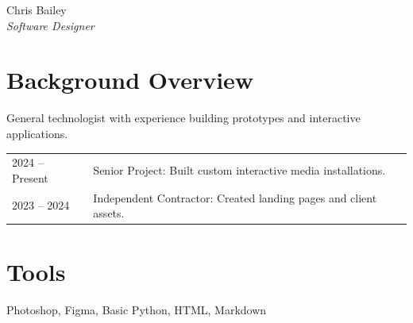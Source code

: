 \documentclass{article}
\begin{document}
\begin{center}
{\huge Chris Bailey} \\
\textit{Software Designer}
\end{center}

\section*{Background Overview}
General technologist with experience building prototypes and interactive applications.

\begin{table}[h]
\begin{tabular}{|l|p{10cm}|}
\hline
2024 -- Present & Senior Project: Built custom interactive media installations. \\
2023 -- 2024 & Independent Contractor: Created landing pages and client assets. \\
\hline
\end{tabular}
\end{table}

\section*{Tools}
Photoshop, Figma, Basic Python, HTML, Markdown
\end{document}
